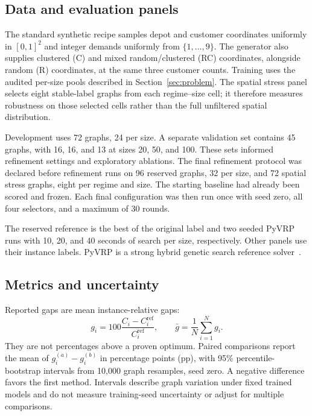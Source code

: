 \documentclass[11pt,a4paper]{article}
\begin{document}
\subsection{Data and evaluation panels}

The standard synthetic recipe samples depot and customer coordinates
uniformly in $[0,1]^2$ and integer demands uniformly from
$\{1,\ldots,9\}$. The generator also supplies clustered (C) and mixed
random/clustered (RC) coordinates, alongside random (R) coordinates, at
the same three customer counts. Training uses the audited per-size pools
described in Section~\ref{sec:problem}. The spatial stress panel selects
eight stable-label graphs from each regime--size cell; it therefore
measures robustness on those selected cells rather than the full unfiltered
spatial distribution.


Development uses 72 graphs, 24 per size. A separate validation set contains
45 graphs, with 16, 16, and 13 at sizes 20, 50, and 100. These sets informed
refinement settings and exploratory ablations. The final refinement protocol
was declared before refinement runs on 96 reserved graphs, 32 per size, and
72 spatial stress graphs, eight per regime and size. The starting baseline
had already been scored and frozen. Each final configuration was then run
once with seed zero, all four selectors, and a maximum of 30 rounds.

The reserved reference is the best of the original label and two seeded
PyVRP runs with 10, 20, and 40 seconds of search per size, respectively.
Other panels use their instance labels. PyVRP is a strong hybrid genetic
search reference solver~\cite{wouda2024pyvrp}.

\subsection{Metrics and uncertainty}

Reported gaps are mean
instance-relative gaps:
\begin{equation}
 g_i=100\frac{C_i-C_i^{\mathrm{ref}}}{C_i^{\mathrm{ref}}},\qquad
 \bar g=\frac{1}{N}\sum_{i=1}^N g_i.
\end{equation}
They are not percentages above a proven optimum. Paired comparisons report
the mean of $g_i^{(a)}-g_i^{(b)}$ in percentage points (pp), with 95\%
percentile-bootstrap intervals from 10,000 graph resamples, seed zero.
A negative difference favors the first method. Intervals describe graph
variation under fixed trained models and do not measure training-seed
uncertainty or adjust for multiple comparisons.
\end{document}
